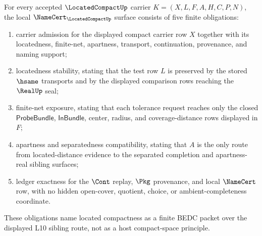\begin{theorem}
\label{thm:located-compact-namecert-obligations}
For every accepted $\LocatedCompactUp$ carrier $K=(X,L,F,A,H,C,P,N)$, the local $\NameCert_{\LocatedCompactUp}$ surface consists of five finite obligations:
\begin{enumerate}
\item carrier admission for the displayed compact carrier row $X$ together with its locatedness, finite-net, apartness, transport, continuation, provenance, and naming support;
\item locatedness stability, stating that the test row $L$ is preserved by the stored $\hsame$ transports and by the displayed comparison rows reaching the $\RealUp$ seal;
\item finite-net exposure, stating that each tolerance request reaches only the closed $\mathsf{ProbeBundle}$, $\mathsf{InBundle}$, center, radius, and coverage-distance rows displayed in $F$;
\item apartness and separatedness compatibility, stating that $A$ is the only route from located-distance evidence to the separated completion and apartness-real sibling surfaces;
\item ledger exactness for the $\Cont$ replay, $\Pkg$ provenance, and local $\NameCert$ row, with no hidden open-cover, quotient, choice, or ambient-completeness coordinate.
\end{enumerate}
These obligations name located compactness as a finite BEDC packet over the displayed L10 sibling route, not as a host compact-space principle.
\end{theorem}
